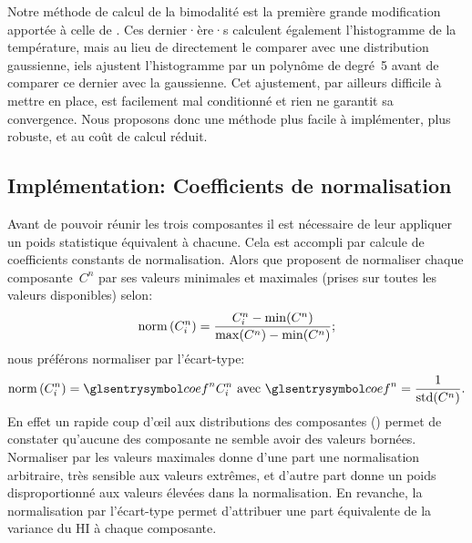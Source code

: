 Notre méthode de calcul de la bimodalité est la première grande modification apportée à celle de \textcite{liu_2016}.
Ces dernier·ère·s calculent également l'histogramme de la température, mais au lieu de directement le comparer avec une distribution gaussienne, iels ajustent l'histogramme par un polynôme de degré~5 avant de comparer ce dernier avec la gaussienne.
Cet ajustement, par ailleurs difficile à mettre en place, est facilement mal conditionné et rien ne garantit sa convergence.
Nous proposons donc une méthode plus facile à implémenter, plus robuste, et au coût de calcul réduit.

\subsection{Implémentation: Coefficients de normalisation}
\label{sec:coef-normalisation}

Avant de pouvoir réunir les trois composantes il est nécessaire de leur appliquer un poids statistique équivalent à chacune. Cela est accompli par calcule de coefficients constants de normalisation.
Alors que \citeauthor{liu_2016} proposent de normaliser chaque composante~\(C^n\) par ses valeurs minimales et maximales (prises sur toutes les valeurs disponibles) selon:
\begin{equation}
  \operatorname{norm}\left(C_i^n\right) = \frac {C_i^n - \min(C^n)} {\max(C^n) - \min(C^n)} ;
\end{equation}
nous préférons normaliser par l'écart-type:
\begin{equation}
  \norm{C_i^n} = \am{coef}^n C_i^n
  \text{ avec } \am{coef}^n = \frac {1} {\std(C^n)} .
\end{equation}
En effet un rapide coup d’œil aux distributions des composantes () permet de constater qu'aucune des composante ne semble avoir des valeurs bornées.
Normaliser par les valeurs maximales donne d'une part une normalisation arbitraire, très sensible aux valeurs extrêmes, et d'autre part donne un poids disproportionné aux valeurs élevées dans la normalisation.
En revanche, la normalisation par l'écart-type permet d'attribuer une part équivalente de la variance du HI à chaque composante.

\begin{figure}
  \centering
  \label{fig:distrib-composantes}
\end{figure}

